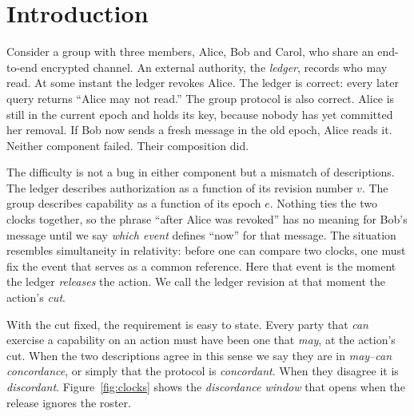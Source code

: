 \documentclass[aps,prx,reprint,superscriptaddress,nofootinbib,floatfix]{revtex4-2}
\theoremstyle{remark}
\begin{document}
\section{Introduction}

Consider a group with three members, Alice, Bob and Carol, who share an end-to-end encrypted channel. An external authority, the \emph{ledger}, records who may read. At some instant the ledger revokes Alice. The ledger is correct: every later query returns ``Alice may not read.'' The group protocol is also correct. Alice is still in the current epoch and holds its key, because nobody has yet committed her removal. If Bob now sends a fresh message in the old epoch, Alice reads it. Neither component failed. Their composition did.

The difficulty is not a bug in either component but a mismatch of descriptions. The ledger describes authorization as a function of its revision number $v$. The group describes capability as a function of its epoch $e$. Nothing ties the two clocks together, so the phrase ``after Alice was revoked'' has no meaning for Bob's message until we say \emph{which event} defines ``now'' for that message. The situation resembles simultaneity in relativity: before one can compare two clocks, one must fix the event that serves as a common reference. Here that event is the moment the ledger \emph{releases} the action. We call the ledger revision at that moment the action's \emph{cut}.

With the cut fixed, the requirement is easy to state. Every party that \emph{can} exercise a capability on an action must have been one that \emph{may}, at the action's cut. When the two descriptions agree in this sense we say they are in \emph{may--can concordance}, or simply that the protocol is \emph{concordant}. When they disagree it is \emph{discordant}. Figure~\ref{fig:clocks} shows the \emph{discordance window} that opens when the release ignores the roster.
\end{document}
